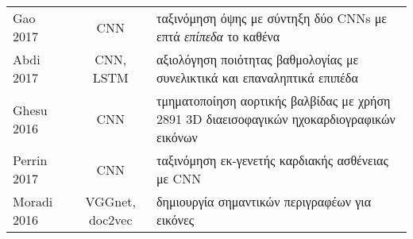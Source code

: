 \begin{sidewaystable}
\begin{tabular}{l c l}
		Gao 2017~\cite{gao2017fused}                  & CNN             & ταξινόμηση όψης με σύντηξη δύο CNNs με επτά \textit{επίπεδα} το καθένα                                                                                                                                                                                                                                                                                                                      \\
		Abdi 2017~\cite{abdi2017quality}              & CNN, LSTM       & αξιολόγηση ποιότητας βαθμολογίας με συνελικτικά και επαναληπτικά επιπέδα                                                                                                                                                                                                                                                                                                           \\
		Ghesu 2016~\cite{ghesu2016marginal}           & CNN             & τμηματοποίηση αορτικής βαλβίδας με χρήση 2891 3D διαεισοφαγικών ηχοκαρδιογραφικών εικόνων                                                                                                                                                                                                                                                                                                   \\
		Perrin 2017~\cite{perrin2017application}      & CNN             & ταξινόμηση εκ-γενετής καρδιακής ασθένειας με CNN                                                                                                                                                                                                                                                                                                                                      \\
		Moradi 2016~\cite{moradi2016cross}            & VGGnet, doc2vec & δημιουργία σημαντικών περιγραφέων για εικόνες                                                                                                                                                                                                                                                                                                                                               \\
		\bottomrule
	\end{tabular}
\end{sidewaystable}

